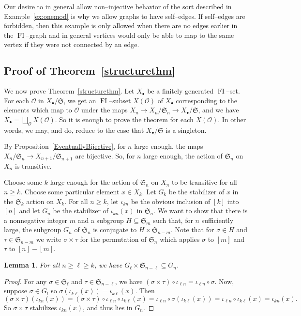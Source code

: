 \documentclass[10pt]{amsart}
\newcommand\cO{\mathcal{O}}
\DeclareMathOperator{\FI}{FI}
\newcommand{\Sn}{\mathfrak{S}}
\newtheorem{lemma}[theorem]{Lemma}
\theoremstyle{definition}
\begin{document}
Our desire to in general allow non--injective behavior of the sort described in Example~\ref{ex:onemod} is why we allow graphs to have self--edges. If self--edges are forbidden, then this example is only allowed when there are no edges earlier in the $\FI$--graph and in general vertices would only be able to map to the same vertex if they were not connected by an edge.


\subsection{Proof of Theorem~\ref{structurethm}}

We now prove Theorem~\ref{structurethm}. Let $X_{\bullet}$ be a finitely generated $\FI$--set. 
For each $\cO$ in $X_{\bullet}/\Sn$, we get an $\FI$--subset $X(\cO)$ of $X_{\bullet}$ corresponding to the elements which map to $\cO$ under the maps $X_n \longrightarrow X_n/\Sn_n \longrightarrow X_{\bullet}/\Sn$, and we have $X_{\bullet} = \bigsqcup_{\cO} X(\cO)$. 
So it is enough to prove the theorem for each $X(\cO)$. In other words, we may, and do, reduce to the case that $X_{\bullet}/\Sn$ is a singleton.

By Proposition~\ref{EventuallyBijective}, for $n$ large enough, the maps $X_n / \Sn_n \to X_{n+1} / \Sn_{n+1}$ are bijective. 
So, for $n$ large enough, the action of $\Sn_n$ on $X_n$ is transitive.

Choose some $k$ large enough for the action of $\Sn_n$ on $X_n$ to be transitive for all $n \geq k$. Choose some particular element $x \in X_k$. Let $G_k$ be the stabilizer of $x$ in the $\Sn_k$ action on $X_k$.
For all $n \geq k$, let $\iota_{kn}$ be the obvious inclusion of $[k]$ into $[n]$ and let $G_n$ be the stabilizer of $\iota_{kn}(x)$ in $\Sn_n$. 
We want to show that there is a nonnegative integer $m$ and a subgroup $H \subseteq \Sn_m$ such that, for $n$ sufficiently large, the subgroup $G_n$ of $\Sn_n$ is conjugate to $H \times \Sn_{n-m}$. Note that for $\sigma \in H$ and $\tau \in \Sn_{n-m}$ we write $\sigma \times \tau$ for the permutation of $\Sn_{n}$ which applies $\sigma$ to $[m]$ and $\tau$ to $[n] - [m]$.


\begin{lemma} \label{StabilizerGrowth}
For all $n \geq \ell \geq k$, we have $G_{\ell} \times \Sn_{n-\ell} \subseteq G_n$.
\end{lemma}

\begin{proof}
For any $\sigma \in \Sn_{\ell}$ and $\tau \in \Sn_{n-\ell}$, we have $(\sigma \times \tau) \circ \iota_{\ell n} = \iota_{\ell n} \circ \sigma$.
Now, suppose $\sigma \in G_l$ so $\sigma (\iota_{k \ell}(x)) = \iota_{k \ell}(x)$. Then 
\[ (\sigma \times \tau) \left( \iota_{kn}(x) \right) = (\sigma \times \tau) \circ \iota_{\ell n} \circ \iota_{k\ell}(x) = \iota_{\ell n} \circ \sigma \left( \iota_{k\ell}(x) \right) = \iota_{\ell n} \circ \iota_{k\ell}(x) = \iota_{kn}(x). \]
So $\sigma \times \tau$ stabilizes $\iota_{kn}(x)$, and thus lies in $G_n$.
\end{proof}
\end{document}
